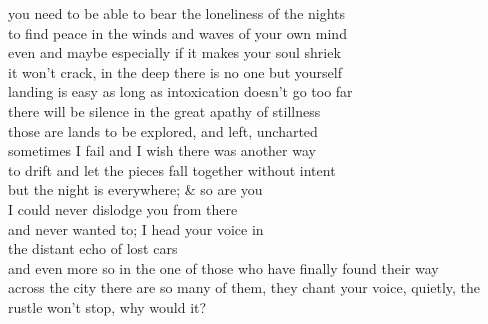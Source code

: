 you need to be able to bear the loneliness of the nights\\
to find peace in the winds and waves of your own mind\\
even and maybe especially if it makes your soul shriek\\
it won't crack, in the deep there is no one but yourself\\

landing is easy as long as intoxication doesn't go too far\\
there will be silence in the great apathy of stillness\\
those are lands to be explored, and left, uncharted\\
sometimes I fail and I wish there was another way\\
to drift and let the pieces fall together without intent\\

but the night is everywhere; \& so are you\\
I could never dislodge you from there\\
and never wanted to; I head your voice in\\
the distant echo of lost cars\\
and even more so in the one of those who have finally found their way\\
across the city there are so many of them, they chant your voice,
quietly, the rustle won't stop, why would it?
